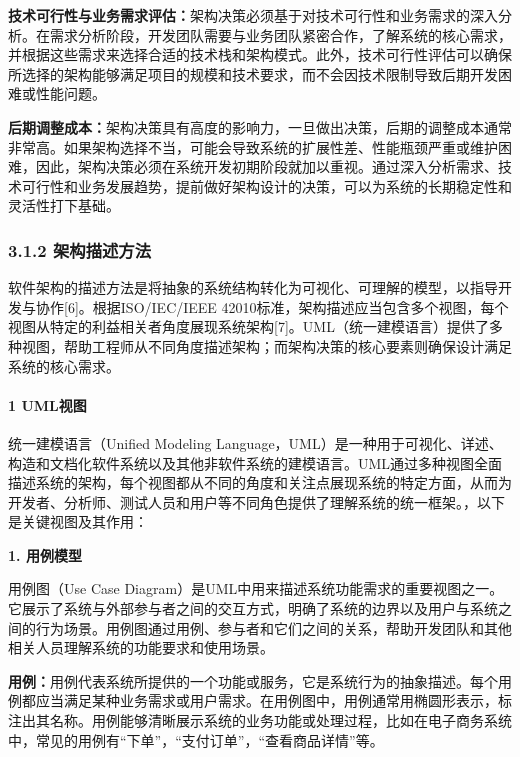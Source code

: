\textbf{技术可行性与业务需求评估：}架构决策必须基于对技术可行性和业务需求的深入分析。在需求分析阶段，开发团队需要与业务团队紧密合作，了解系统的核心需求，并根据这些需求来选择合适的技术栈和架构模式。此外，技术可行性评估可以确保所选择的架构能够满足项目的规模和技术要求，而不会因技术限制导致后期开发困难或性能问题。

\textbf{后期调整成本：}架构决策具有高度的影响力，一旦做出决策，后期的调整成本通常非常高。如果架构选择不当，可能会导致系统的扩展性差、性能瓶颈严重或维护困难，因此，架构决策必须在系统开发初期阶段就加以重视。通过深入分析需求、技术可行性和业务发展趋势，提前做好架构设计的决策，可以为系统的长期稳定性和灵活性打下基础。

\subsubsection{3.1.2 架构描述方法}\label{ux67b6ux6784ux63cfux8ff0ux65b9ux6cd5}

软件架构的描述方法是将抽象的系统结构转化为可视化、可理解的模型，以指导开发与协作{[}6{]}。根据ISO/IEC/IEEE 42010标准，架构描述应当包含多个视图，每个视图从特定的利益相关者角度展现系统架构{[}7{]}。UML（统一建模语言）提供了多种视图，帮助工程师从不同角度描述架构；而架构决策的核心要素则确保设计满足系统的核心需求。

\paragraph{1 UML视图}\label{umlux89c6ux56fe}

统一建模语言（Unified Modeling Language，UML）是一种用于可视化、详述、构造和文档化软件系统以及其他非软件系统的建模语言。UML通过多种视图全面描述系统的架构，每个视图都从不同的角度和关注点展现系统的特定方面，从而为开发者、分析师、测试人员和用户等不同角色提供了理解系统的统一框架。，以下是关键视图及其作用：

\textbf{1. 用例模型}

用例图（Use Case Diagram）是UML中用来描述系统功能需求的重要视图之一。它展示了系统与外部参与者之间的交互方式，明确了系统的边界以及用户与系统之间的行为场景。用例图通过用例、参与者和它们之间的关系，帮助开发团队和其他相关人员理解系统的功能要求和使用场景。

\textbf{用例：}用例代表系统所提供的一个功能或服务，它是系统行为的抽象描述。每个用例都应当满足某种业务需求或用户需求。在用例图中，用例通常用椭圆形表示，标注出其名称。用例能够清晰展示系统的业务功能或处理过程，比如在电子商务系统中，常见的用例有``下单''，``支付订单''，``查看商品详情''等。


